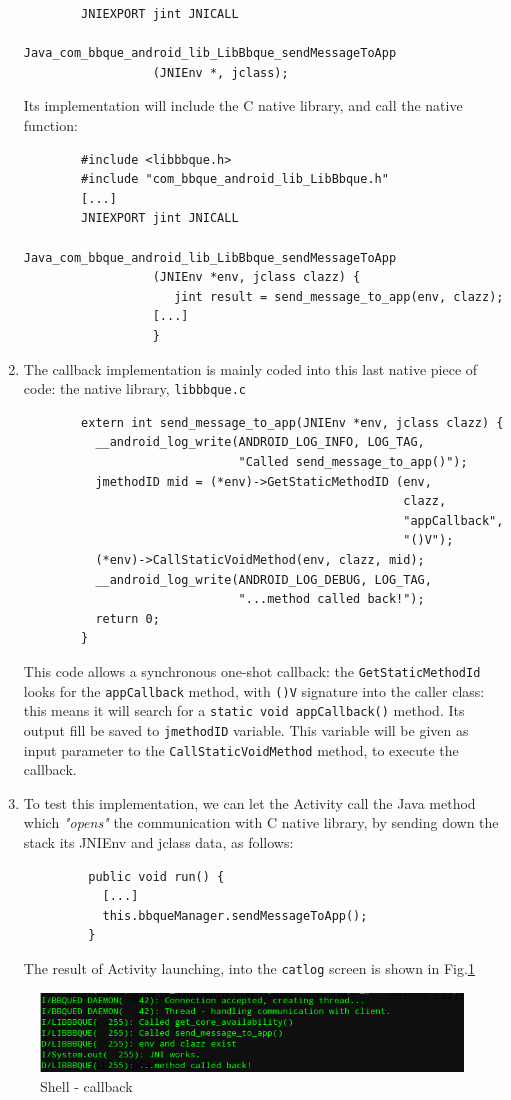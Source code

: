 \begin{enumerate}
\begin{verbatim}
		JNIEXPORT jint JNICALL
		          Java_com_bbque_android_lib_LibBbque_sendMessageToApp
		          (JNIEnv *, jclass);
	\end{verbatim}
	Its implementation will include the C native library, and call the native function:
	\begin{verbatim}
		#include <libbbque.h>
		#include "com_bbque_android_lib_LibBbque.h"
		[...]
		JNIEXPORT jint JNICALL
		          Java_com_bbque_android_lib_LibBbque_sendMessageToApp
		          (JNIEnv *env, jclass clazz) {
		             jint result = send_message_to_app(env, clazz);
		          [...]
		          }
	\end{verbatim}
	\item The callback implementation is mainly coded into this last native piece of code: the native library, \texttt{libbbque.c}
	\begin{verbatim}
		extern int send_message_to_app(JNIEnv *env, jclass clazz) {
		  __android_log_write(ANDROID_LOG_INFO, LOG_TAG,
		                      "Called send_message_to_app()");
		  jmethodID mid = (*env)->GetStaticMethodID (env, 
		                                             clazz,
		                                             "appCallback",
		                                             "()V");
		  (*env)->CallStaticVoidMethod(env, clazz, mid);
		  __android_log_write(ANDROID_LOG_DEBUG, LOG_TAG,
		                      "...method called back!");	
		  return 0;
		}
	\end{verbatim}
	This code allows a synchronous one-shot callback: the \texttt{GetStaticMethodId} looks for the \texttt{appCallback} method, with \texttt{()V} signature into the caller class: this means it will search for a \texttt{static void appCallback()} method. Its output fill be saved to \texttt{jmethodID} variable. This variable will be given as input parameter to the \texttt{CallStaticVoidMethod} method, to execute the callback.
	\item To test this implementation, we can let the Activity call the Java method which \textit{"opens"} the communication with C native library, by sending down the stack its JNIEnv and jclass data, as follows:
	\begin{verbatim}
		 public void run() {
		   [...]
		   this.bbqueManager.sendMessageToApp();
		 }
	\end{verbatim}
	The result of Activity launching, into the \texttt{catlog} screen is shown in Fig.\ref{fig:shell2}
\end{enumerate}
\begin{figure}[!htb]
	\centering
	\includegraphics[scale=.505]{images/shell2.png}
	\caption{Shell - callback}
	\label{fig:shell2}
\end{figure}
